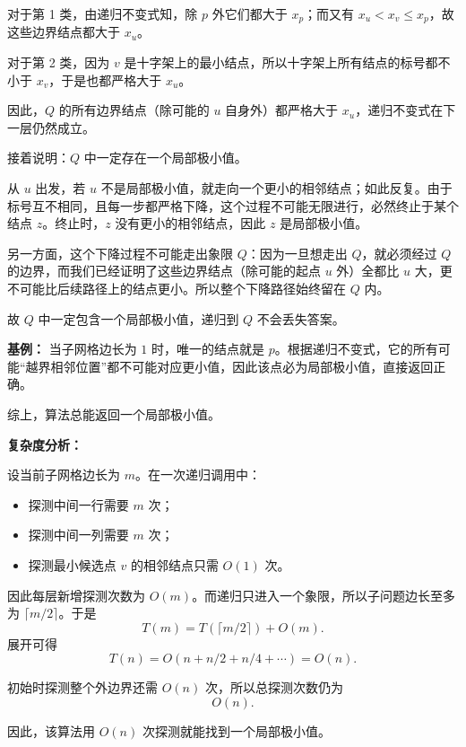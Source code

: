 ﻿\documentclass[12pt,a4paper]{article}
\begin{document}
\begin{answerbox}
对于第 1 类，由递归不变式知，除 $p$ 外它们都大于 $x_p$；而又有 $x_u < x_v \le x_p$，故这些边界结点都大于 $x_u$。

对于第 2 类，因为 $v$ 是十字架上的最小结点，所以十字架上所有结点的标号都不小于 $x_v$，于是也都严格大于 $x_u$。

因此，$Q$ 的所有边界结点（除可能的 $u$ 自身外）都严格大于 $x_u$，递归不变式在下一层仍然成立。

\medskip
接着说明：$Q$ 中一定存在一个局部极小值。

从 $u$ 出发，若 $u$ 不是局部极小值，就走向一个更小的相邻结点；如此反复。由于标号互不相同，且每一步都严格下降，这个过程不可能无限进行，必然终止于某个结点 $z$。终止时，$z$ 没有更小的相邻结点，因此 $z$ 是局部极小值。

另一方面，这个下降过程不可能走出象限 $Q$：因为一旦想走出 $Q$，就必须经过 $Q$ 的边界，而我们已经证明了这些边界结点（除可能的起点 $u$ 外）全都比 $u$ 大，更不可能比后续路径上的结点更小。所以整个下降路径始终留在 $Q$ 内。

故 $Q$ 中一定包含一个局部极小值，递归到 $Q$ 不会丢失答案。

\medskip
\textbf{基例：}
当子网格边长为 $1$ 时，唯一的结点就是 $p$。根据递归不变式，它的所有可能“越界相邻位置”都不可能对应更小值，因此该点必为局部极小值，直接返回正确。

综上，算法总能返回一个局部极小值。

\medskip
\textbf{复杂度分析：}

设当前子网格边长为 $m$。在一次递归调用中：

\begin{itemize}
    \item 探测中间一行需要 $m$ 次；
    \item 探测中间一列需要 $m$ 次；
    \item 探测最小候选点 $v$ 的相邻结点只需 $O(1)$ 次。
\end{itemize}

因此每层新增探测次数为 $O(m)$。而递归只进入一个象限，所以子问题边长至多为 $\lceil m/2\rceil$。于是
\[
T(m)=T(\lceil m/2\rceil)+O(m).
\]
展开可得
\[
T(n)=O(n+n/2+n/4+\cdots)=O(n).
\]

初始时探测整个外边界还需 $O(n)$ 次，所以总探测次数仍为
\[
O(n).
\]

因此，该算法用 $O(n)$ 次探测就能找到一个局部极小值。

\end{answerbox}
\end{document}
